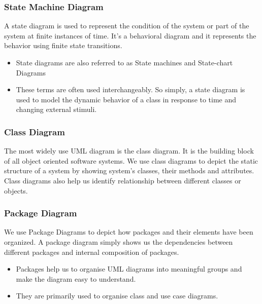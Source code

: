 \newpage

\subsubsection*{State Machine Diagram}

A state diagram is used to represent the condition of the system or part of the system at finite instances of time. It’s a behavioral diagram and it represents the behavior using finite state transitions.

\begin{itemize}
    \item State diagrams are also referred to as State machines and State-chart Diagrams
    \item These terms are often used interchangeably. So simply, a state diagram is used to model the dynamic behavior of a class in response to time and changing external stimuli.
\end{itemize}

\subsubsection*{Class Diagram}

The most widely use UML diagram is the class diagram. It is the building block of all object oriented software systems. We use class diagrams to depict the static structure of a system by showing system's classes, their methods and attributes. Class diagrams also help us identify relationship between different classes or objects.

\subsubsection*{Package Diagram}

We use Package Diagrams to depict how packages and their elements have been organized. A package diagram simply shows us the dependencies between different packages and internal composition of packages.

\begin{itemize}
    \item Packages help us to organise UML diagrams into meaningful groups and make the diagram easy to understand.
    \item They are primarily used to organise class and use case diagrams.
\end{itemize}






